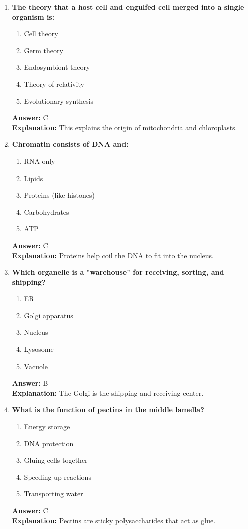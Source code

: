 \documentclass[11pt, a4paper]{article}
\begin{document}
\begin{enumerate}[leftmargin=*, label=\arabic*.]
\item \textbf{The theory that a host cell and engulfed cell merged into a single organism is:}
\begin{enumerate}[label=\Alph*.]
\item Cell theory
\item Germ theory
\item Endosymbiont theory
\item Theory of relativity
\item Evolutionary synthesis
\end{enumerate}
\textbf{Answer:} C \\
\textbf{Explanation:} This explains the origin of mitochondria and chloroplasts.

\item \textbf{Chromatin consists of DNA and:}
\begin{enumerate}[label=\Alph*.]
\item RNA only
\item Lipids
\item Proteins (like histones)
\item Carbohydrates
\item ATP
\end{enumerate}
\textbf{Answer:} C \\
\textbf{Explanation:} Proteins help coil the DNA to fit into the nucleus.

\item \textbf{Which organelle is a "warehouse" for receiving, sorting, and shipping?}
\begin{enumerate}[label=\Alph*.]
\item ER
\item Golgi apparatus
\item Nucleus
\item Lysosome
\item Vacuole
\end{enumerate}
\textbf{Answer:} B \\
\textbf{Explanation:} The Golgi is the shipping and receiving center.

\item \textbf{What is the function of pectins in the middle lamella?}
\begin{enumerate}[label=\Alph*.]
\item Energy storage
\item DNA protection
\item Gluing cells together
\item Speeding up reactions
\item Transporting water
\end{enumerate}
\textbf{Answer:} C \\
\textbf{Explanation:} Pectins are sticky polysaccharides that act as glue.


\end{enumerate}
\end{document}
